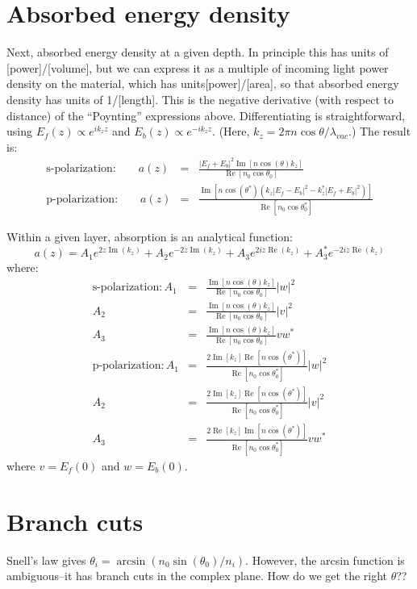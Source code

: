 \documentclass[12pt]{article}
\newcommand{\bea}{\begin{eqnarray*}} %
\newcommand{\eea}{\end{eqnarray*}} %
\renewcommand{\(}{\left(}
\renewcommand{\)}{\right)}
\renewcommand{\Im}{\operatorname{Im}}
\renewcommand{\Re}{\operatorname{Re}}
\begin{document}
\section{Absorbed energy density}
Next, absorbed energy density at a given depth. In principle this has units of [power]/[volume], but we can express it as a multiple of incoming light power density on the material, which has units[power]/[area], so that absorbed energy density has units of 1/[length]. This is the negative derivative (with respect to distance) of the ``Poynting'' expressions above. Differentiating is straightforward, using $E_f(z) \propto e^{i k_z z}$ and $E_b(z) \propto e^{-i k_z z}$. (Here, $k_z=2\pi n\cos\theta/\lambda_{vac}$.) The result is:
\bea
\text{s-polarization:} \qquad a(z) &=& \frac{|E_f+E_b|^2 \Im\left[ n \cos(\theta) k_z\right] }{\Re\left[ n_0 \cos \theta_0 \right] } \\
\text{p-polarization:} \qquad a(z) &=& \frac{\Im\left[ n \cos(\theta^*)\(k_z|E_f-E_b|^2-k_z^*|E_f+E_b|^2\)\right]}{\Re \left[ n_0 \cos \theta_0^* \right] }
\eea

Within a given layer, absorption is an analytical function:
$$a(z) = A_1e^{2 z \Im(k_z)} + A_2e^{-2 z \Im(k_z)} + A_3e^{2iz\Re(k_z)} + A_3^* e^{-2iz \Re(k_z)}$$
where:
\bea
\text{s-polarization}: A_1 &=& \frac{\Im\left[ n \cos(\theta) k_z\right] }{\Re\left[ n_0 \cos \theta_0 \right] }|w|^2\\
A_2 &=& \frac{\Im\left[ n \cos(\theta) k_z\right] }{\Re \left[ n_0 \cos \theta_0 \right] }|v|^2\\
A_3 &=& \frac{\Im\left[ n \cos(\theta) k_z\right] }{\Re \left[ n_0 \cos \theta_0 \right] }vw^*\\
\text{p-polarization}: A_1 &=& \frac{2\Im\left[ k_z\right] \Re\left[ n \cos(\theta^*)\right] }{\Re \left[ n_0 \cos \theta_0^* \right] } |w|^2\\
A_2 &=& \frac{2\Im\left[ k_z \right] \Re \left[ n \cos(\theta^*)\right] }{\Re \left[ n_0 \cos \theta_0^* \right] } |v|^2\\
A_3 &=& \frac{2\Re\left[ k_z \right] \Im \left[ n \cos(\theta^*)\right] }{\Re \left[ n_0 \cos \theta_0^* \right] } vw^*
\eea
where $v = E_f(0)$ and $w=E_b(0)$.

\section{Branch cuts \label{branchcuts}}

Snell's law gives $\theta_i = \arcsin(n_0 \sin(\theta_0)/n_i)$. However, the arcsin function is ambiguous--it has branch cuts in the complex plane. How do we get the right $\theta$??
\end{document}
